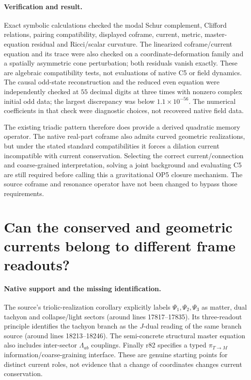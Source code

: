 \documentclass[11pt,a4paper]{article}
\begin{document}
\paragraph{Verification and result.}
Exact symbolic calculations checked the modal Schur complement,
Clifford relations, pairing compatibility, displayed coframe, current,
metric, master-equation residual and Ricci/scalar curvature.
The linearized coframe/current equation and its trace were also checked
on a coordinate-deformation family and a spatially asymmetric cone
perturbation; both residuals vanish exactly. These are algebraic
compatibility tests, not evaluations of native C5 or field dynamics.
The causal odd-state reconstruction and the reduced even equation
were independently checked at $55$ decimal digits at three times
with nonzero complex initial odd data; the largest discrepancy was
below $1.1\times10^{-56}$. The numerical coefficients in that check
were diagnostic choices, not recovered native field data.

The existing triadic pattern therefore does provide a derived
quadratic memory operator. The native real-part coframe also admits
curved geometric realizations, but under the stated standard
compatibilities it forces a dilation current incompatible with
current conservation. Selecting the correct current/connection and
coarse-grained interpretation, solving a joint background and
evaluating C5 are still required before calling this a gravitational
OP5 closure mechanism. The source coframe and resonance operator
have not been changed to bypass those requirements.

\section{Can the conserved and geometric currents belong to different frame readouts?}
\label{sec:sector-current-readout-bridge}

\paragraph{Native support and the missing identification.}
The source's triolic-realization corollary explicitly labels
$\Psi_1,\Psi_2,\Psi_3$ as matter, dual tachyon and collapse/light sectors
(around lines 17817--17835). Its three-readout principle identifies the
tachyon branch as the $J$-dual reading of the same branch source
(around lines 18213--18246). The semi-concrete structural master equation
also includes inter-sector $\Lambda_{ab}$ couplings. Finally r82 specifies
a typed $\pi_{T\to M}$ information/coarse-graining interface. These are
genuine starting points for distinct current roles, not evidence that a
change of coordinates changes current conservation.
\end{document}
